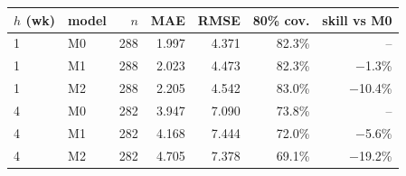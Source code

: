 \begin{tabular}{llrrrrr}
\toprule
$h$ (wk) & model & $n$ & MAE & RMSE & 80\% cov. & skill vs M0 \\
\midrule
  1 & M0 & 288 & 1.997 & 4.371 & 82.3\% & -- \\
  1 & M1 & 288 & 2.023 & 4.473 & 82.3\% & $-$1.3\% \\
  1 & M2 & 288 & 2.205 & 4.542 & 83.0\% & $-$10.4\% \\
  4 & M0 & 282 & 3.947 & 7.090 & 73.8\% & -- \\
  4 & M1 & 282 & 4.168 & 7.444 & 72.0\% & $-$5.6\% \\
  4 & M2 & 282 & 4.705 & 7.378 & 69.1\% & $-$19.2\% \\
\bottomrule
\end{tabular}
